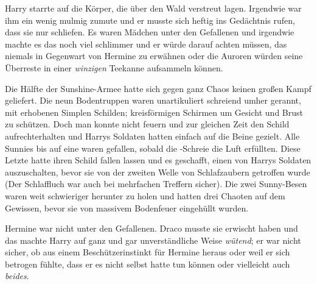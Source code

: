 \later

Harry starrte auf die Körper, die über den Wald verstreut lagen. Irgendwie war ihm ein wenig mulmig zumute und er musste sich heftig ins Gedächtnis rufen, dass sie nur schliefen. Es waren Mädchen unter den Gefallenen und irgendwie machte es das noch viel schlimmer und er würde darauf achten müssen, das niemals in Gegenwart von Hermine zu erwähnen oder die Auroren würden seine Überreste in einer \emph{winzigen} Teekanne aufsammeln können.

Die Hälfte der Sunshine-Armee hatte sich gegen ganz Chaos keinen großen Kampf geliefert. Die neun Bodentruppen waren unartikuliert schreiend umher gerannt, mit erhobenen Simplen Schilden; kreisförmigen Schirmen um Gesicht und Brust zu schützen. Doch man konnte nicht feuern und zur gleichen Zeit den Schild aufrechterhalten und Harrys Soldaten hatten einfach auf die Beine gezielt. Alle Sunnies bis auf eine waren gefallen, sobald die -Schreie die Luft erfüllten. Diese Letzte hatte ihren Schild fallen lassen und es geschafft, einen von Harrys Soldaten auszuschalten, bevor sie von der zweiten Welle von Schlafzaubern getroffen wurde (Der Schlaffluch war auch bei mehrfachen Treffern sicher). Die zwei Sunny-Besen waren weit schwieriger herunter zu holen und hatten drei Chaoten auf dem Gewissen, bevor sie von massivem Bodenfeuer eingehüllt wurden.

Hermine war nicht unter den Gefallenen. Draco musste sie erwischt haben und das machte Harry auf ganz und gar unverständliche Weise \emph{wütend}; er war nicht sicher, ob aus einem Beschützerinstinkt für Hermine heraus oder weil er sich betrogen fühlte, dass er es nicht selbst hatte tun können oder vielleicht auch \emph{beides}.

